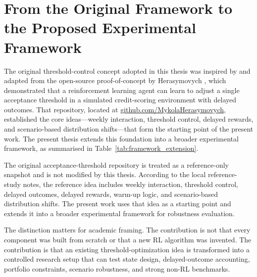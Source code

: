 \documentclass[12pt,a4paper]{article}
\begin{document}
\section{From the Original Framework to the Proposed Experimental Framework}

The original threshold-control concept adopted in this thesis was inspired by and adapted from the open-source proof-of-concept by Herasymovych \cite{herasymovych2019}, which demonstrated that a reinforcement learning agent can learn to adjust a single acceptance threshold in a simulated credit-scoring environment with delayed outcomes. That repository, located at \href{https://github.com/MykolaHerasymovych/Optimizing-Acceptance-Threshold-in-Credit-Scoring-using-Reinforcement-Learning}{github.com/MykolaHerasymovych}, established the core ideas---weekly interaction, threshold control, delayed rewards, and scenario-based distribution shifts---that form the starting point of the present work. The present thesis extends this foundation into a broader experimental framework, as summarised in Table~\ref{tab:framework_extension}.

The original acceptance-threshold repository is treated as a reference-only snapshot and is not modified by this thesis. According to the local reference-study notes, the reference idea includes weekly interaction, threshold control, delayed outcomes, delayed rewards, warm-up logic, and scenario-based distribution shifts. The present work uses that idea as a starting point and extends it into a broader experimental framework for robustness evaluation.

The distinction matters for academic framing. The contribution is not that every component was built from scratch or that a new RL algorithm was invented. The contribution is that an existing threshold-optimization idea is transformed into a controlled research setup that can test state design, delayed-outcome accounting, portfolio constraints, scenario robustness, and strong non-RL benchmarks.
\end{document}
